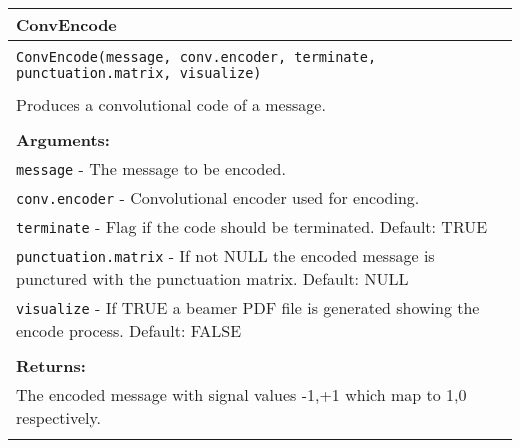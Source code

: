 \begin{longtable}{|p{\textwidth}|}
\hline
\rowcolor{lightblue}ConvEncode\\
\hline
\\
\texttt{ConvEncode(message, conv.encoder, terminate, punctuation.matrix, visualize)}\\
\\
Produces a convolutional code of a message.\\
\\
\textbf{Arguments:}\\
\texttt{message} - The message to be encoded.\\
\texttt{conv.encoder} - Convolutional encoder used for encoding.\\
\texttt{terminate} - Flag if the code should be terminated. Default: TRUE\\
\texttt{punctuation.matrix} - If not NULL the encoded message is punctured with the punctuation matrix. Default: NULL\\
\texttt{visualize} - If TRUE a beamer PDF file is generated showing the encode process. Default: FALSE\\
\\
\textbf{Returns:}\\
The encoded message with signal values -1,+1 which map to 1,0 respectively.\\
\\
\hline
\end{longtable}